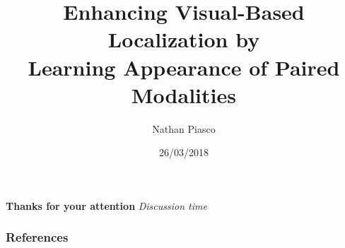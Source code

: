 \documentclass[9pt]{beamer}
\title[Multi-modal Visual Localization]{Enhancing Visual-Based Localization by  \\
Learning Appearance of Paired Modalities}
\subtitle{}
\author{Nathan Piasco}
\institute{pLaTINUM project, Saint-Mandé} %
\date{26/03/2018}
\begin{document}
\begin{frame}[plain,c]
	\titlepage
\end{frame}

\begin{frame}[plain,c]
	\tableofcontents
\end{frame}







\begin{frame}[plain,c]
\centering
\vfill
\textbf{\huge{Thanks for your attention}}
\vfill
\huge{\textit{Discussion time}}
\vfill
\end{frame}

\begin{frame}
\frametitle{References}


\scriptsize{}

\end{frame}

\appendix
%
\end{document}
